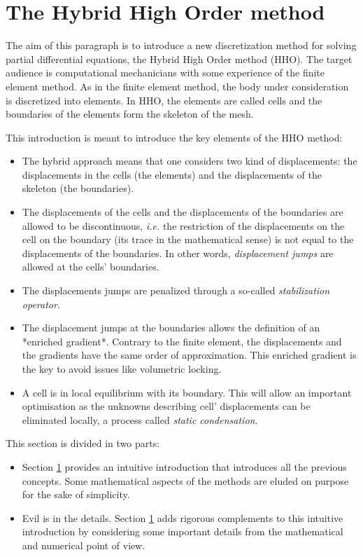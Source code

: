 \section{The Hybrid High Order method}

The aim of this paragraph is to introduce a new discretization method
for solving partial differential equations, the Hybrid High Order method
(HHO). The target audience is computational mechanicians with some
experience of the finite element method. As in the finite element
method, the body under consideration is discretized into elements. In
HHO, the elements are called cells and the boundaries of the elements
form the skeleton of the mesh.

This introduction is meant to introduce the key elements of the
HHO method:
\begin{itemize}
    \item The hybrid approach means that one considers two kind of
    displacements: the displacements in the cells (the elements) and the
    displacements of the skeleton (the boundaries).
    \item The displacements of the cells and the displacements of the boundaries
    are allowed to be discontinuous, \textit{i.e.} the restriction of the
    displacements on the cell on the boundary (its trace in the
    mathematical sense) is not equal to the displacements of the
    boundaries. In other words, \textit{displacement jumps} are allowed at the
    cells' boundaries.
    \item The displacements jumps are penalized through a so-called
    \textit{stabilization operator}.
    \item The displacement jumps at the boundaries allows the definition of an
    *enriched gradient*. Contrary to the finite element, the displacements
    and the gradients have the same order of approximation. This
    enriched gradient is the key to avoid issues like volumetric
    locking.
    \item A cell is in local equilibrium with its boundary. This will allow an
    important optimisation as the unknowns describing cell' displacements
    can be eliminated locally, a process called \textit{static condensation}.
\end{itemize}

This section is divided in two parts:
\begin{itemize}
    \item Section \ref{} provides an intuitive introduction that
    introduces all the previous concepts. Some mathematical aspects of the
    methods are eluded on purpose for the sake of simplicity.
    \item Evil is in the details. Section \ref{} adds
    rigorous complements to this intuitive introduction by considering
    some important details from the mathematical and numerical point of
    view.
\end{itemize}

